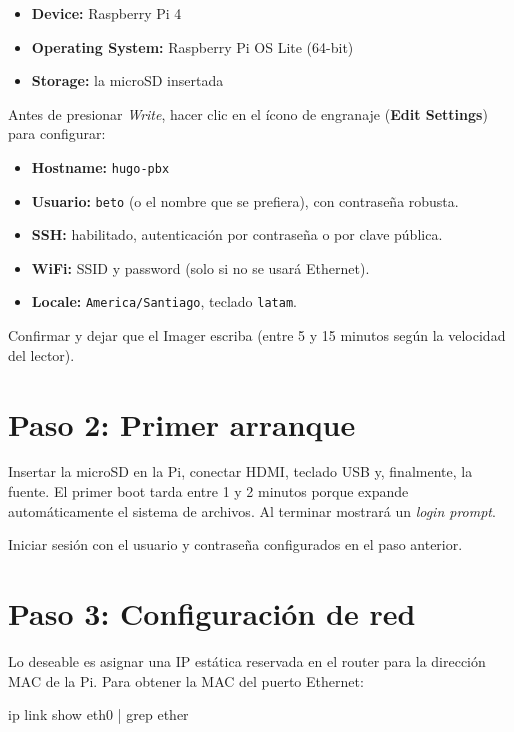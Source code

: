 \begin{itemize}
  \item \textbf{Device:} Raspberry Pi 4
  \item \textbf{Operating System:} Raspberry Pi OS Lite (64-bit)
  \item \textbf{Storage:} la microSD insertada
\end{itemize}

Antes de presionar \emph{Write}, hacer clic en el ícono de engranaje (\textsf{\textbf{\textcolor{hugoblue}{Edit Settings}}}) para configurar:

\begin{itemize}
  \item \textbf{Hostname:} \texttt{hugo-pbx}
  \item \textbf{Usuario:} \texttt{beto} (o el nombre que se prefiera), con contraseña robusta.
  \item \textbf{SSH:} habilitado, autenticación por contraseña o por clave pública.
  \item \textbf{WiFi:} SSID y password (solo si no se usará Ethernet).
  \item \textbf{Locale:} \texttt{America/Santiago}, teclado \texttt{latam}.
\end{itemize}

Confirmar y dejar que el Imager escriba (entre 5 y 15 minutos según la velocidad del lector).

\section{Paso 2: Primer arranque}

Insertar la microSD en la Pi, conectar HDMI, teclado USB y, finalmente, la fuente. El primer boot tarda entre 1 y 2 minutos porque expande automáticamente el sistema de archivos. Al terminar mostrará un \emph{login prompt}.

Iniciar sesión con el usuario y contraseña configurados en el paso anterior.

\section{Paso 3: Configuración de red}

Lo deseable es asignar una IP estática reservada en el router para la dirección MAC de la Pi. Para obtener la MAC del puerto Ethernet:

\begin{shellcode}
ip link show eth0 | grep ether
\end{shellcode}

